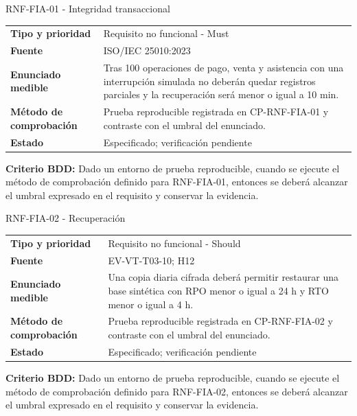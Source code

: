 \begin{reqbox}[colframe=Teal]{RNF-FIA-01 - Integridad transaccional}
\begin{tabularx}{\textwidth}{>{\bfseries}p{3.2cm}Y}
Tipo y prioridad & Requisito no funcional - Must \\
Fuente & ISO/IEC 25010:2023 \\
Enunciado medible & Tras 100 operaciones de pago, venta y asistencia con una interrupción simulada no deberán quedar registros parciales y la recuperación será menor o igual a 10 min. \\
Método de comprobación & Prueba reproducible registrada en CP-RNF-FIA-01 y contraste con el umbral del enunciado. \\
Estado & Especificado; verificación pendiente \\
\end{tabularx}
\textbf{Criterio BDD:} Dado un entorno de prueba reproducible, cuando se ejecute el método de comprobación definido para RNF-FIA-01, entonces se deberá alcanzar el umbral expresado en el requisito y conservar la evidencia.
\end{reqbox}


\begin{reqbox}[colframe=Teal]{RNF-FIA-02 - Recuperación}
\begin{tabularx}{\textwidth}{>{\bfseries}p{3.2cm}Y}
Tipo y prioridad & Requisito no funcional - Should \\
Fuente & EV-VT-T03-10; H12 \\
Enunciado medible & Una copia diaria cifrada deberá permitir restaurar una base sintética con RPO menor o igual a 24 h y RTO menor o igual a 4 h. \\
Método de comprobación & Prueba reproducible registrada en CP-RNF-FIA-02 y contraste con el umbral del enunciado. \\
Estado & Especificado; verificación pendiente \\
\end{tabularx}
\textbf{Criterio BDD:} Dado un entorno de prueba reproducible, cuando se ejecute el método de comprobación definido para RNF-FIA-02, entonces se deberá alcanzar el umbral expresado en el requisito y conservar la evidencia.
\end{reqbox}


